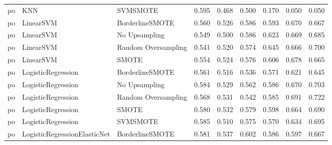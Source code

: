 \begin{tabular}{lllllllll}
      po &                          KNN &            SVMSMOTE & 0.595 &                     0.468 &                 0.500 &                  0.170 &                                   0.050 &     0.050 \\
      po &                    LinearSVM &     BorderlineSMOTE & 0.560 &                     0.526 &                 0.586 &                  0.593 &                                   0.670 &     0.667 \\
      po &                    LinearSVM &       No Upsampling & 0.549 &                     0.500 &                 0.586 &                  0.623 &                                   0.669 &     0.685 \\
      po &                    LinearSVM & Random Oversampling & 0.541 &                     0.520 &                 0.574 &                  0.645 &                                   0.666 &     0.700 \\
      po &                    LinearSVM &               SMOTE & 0.554 &                     0.524 &                 0.576 &                  0.606 &                                   0.678 &     0.665 \\
      po &           LogisticRegression &     BorderlineSMOTE & 0.561 &                     0.516 &                 0.536 &                  0.571 &                                   0.621 &     0.645 \\
      po &           LogisticRegression &       No Upsampling & 0.584 &                     0.529 &                 0.562 &                  0.586 &                                   0.670 &     0.703 \\
      po &           LogisticRegression & Random Oversampling & 0.568 &                     0.531 &                 0.542 &                  0.585 &                                   0.691 &     0.722 \\
      po &           LogisticRegression &               SMOTE & 0.580 &                     0.532 &                 0.579 &                  0.598 &                                   0.664 &     0.690 \\
      po &           LogisticRegression &            SVMSMOTE & 0.585 &                     0.510 &                 0.575 &                  0.570 &                                   0.634 &     0.695 \\
      po & LogisticRegressionElasticNet &     BorderlineSMOTE & 0.581 &                     0.537 &                 0.602 &                  0.586 &                                   0.597 &     0.667 \\

\end{tabular}
